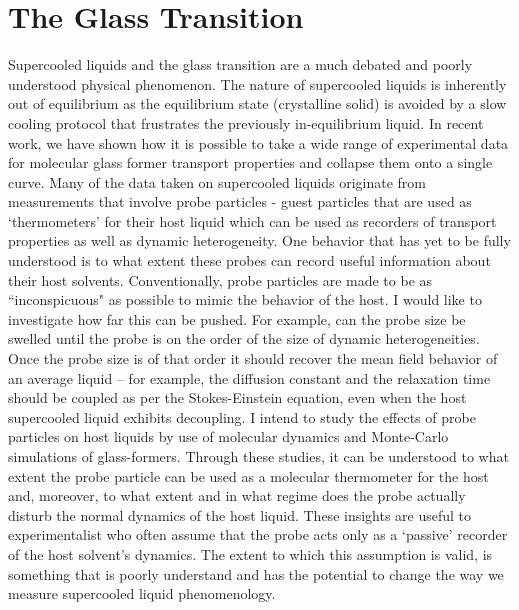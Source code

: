 \documentclass[11pt]{article}
\begin{document}
\section{The Glass Transition}
Supercooled liquids and the glass transition are a much debated and poorly understood physical phenomenon.  The nature of supercooled liquids is inherently out of equilibrium as the equilibrium state (crystalline solid) is avoided by a slow cooling protocol that frustrates the previously in-equilibrium liquid.  In recent work, we have shown how it is possible to take a wide range of experimental data for  molecular glass former transport properties and collapse them onto a single curve. Many of the data taken on supercooled liquids originate from measurements that involve probe particles - guest particles that are used as `thermometers' for their host liquid which can be used as recorders of transport properties as well as dynamic heterogeneity.  One behavior that has yet to be fully understood is to what extent these probes can record useful information about their host solvents.  Conventionally, probe particles are made to be as ``inconspicuous" as possible to mimic the behavior of the host.  I would like to investigate how far this can be pushed.  For example, can the probe size be swelled until the probe is on the order of the size of dynamic heterogeneities.   Once the probe size is of that order it should recover the mean field behavior of an average liquid -- for example, the diffusion constant and the relaxation time should be coupled as per the Stokes-Einstein equation, even when the host supercooled liquid exhibits decoupling. I intend to study the effects of probe particles on host liquids by use of molecular dynamics and Monte-Carlo simulations of glass-formers.  Through these studies, it can be understood to what extent the probe particle can be used as a molecular thermometer for the host and, moreover, to what extent and in what regime does the probe actually disturb the normal dynamics of the host liquid.  These insights are useful to experimentalist who often assume that the probe acts only as a `passive' recorder of the host solvent's dynamics.  The extent to which this assumption is valid, is something that is poorly understand and has the potential to change the way we measure supercooled liquid phenomenology.  
\end{document}
